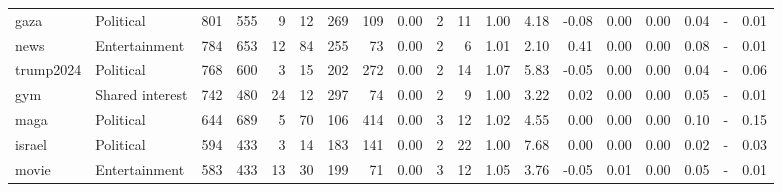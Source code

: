 \begin{tabular}{llrrrrrrrrrrrrrrrrr}
            gaza &       Political &    801 &    555 &                           9 &                           12 &           269 &                        109 &     0.00 &    2 &     11 & 1.00 &   4.18 &                              -0.08 &   0.00 &         0.00 &                                0.04 &                                    - &                                     0.01 \\
            news &   Entertainment &    784 &    653 &                          12 &                           84 &           255 &                         73 &     0.00 &    2 &      6 & 1.01 &   2.10 &                               0.41 &   0.00 &         0.00 &                                0.08 &                                    - &                                     0.01 \\
       trump2024 &       Political &    768 &    600 &                           3 &                           15 &           202 &                        272 &     0.00 &    2 &     14 & 1.07 &   5.83 &                              -0.05 &   0.00 &         0.00 &                                0.04 &                                    - &                                     0.06 \\
             gym & Shared interest &    742 &    480 &                          24 &                           12 &           297 &                         74 &     0.00 &    2 &      9 & 1.00 &   3.22 &                               0.02 &   0.00 &         0.00 &                                0.05 &                                    - &                                     0.01 \\
            maga &       Political &    644 &    689 &                           5 &                           70 &           106 &                        414 &     0.00 &    3 &     12 & 1.02 &   4.55 &                               0.00 &   0.00 &         0.00 &                                0.10 &                                    - &                                     0.15 \\
          israel &       Political &    594 &    433 &                           3 &                           14 &           183 &                        141 &     0.00 &    2 &     22 & 1.00 &   7.68 &                               0.00 &   0.00 &         0.00 &                                0.02 &                                    - &                                     0.03 \\
           movie &   Entertainment &    583 &    433 &                          13 &                           30 &           199 &                         71 &     0.00 &    3 &     12 & 1.05 &   3.76 &                              -0.05 &   0.01 &         0.00 &                                0.05 &                                    - &                                     0.01 \\

\end{tabular}
